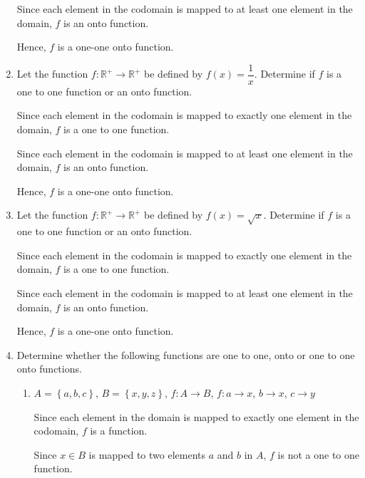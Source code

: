 \documentclass[12pt]{report}
\begin{document}
\begin{enumerate}
            Since each element in the codomain is mapped to at least one element in the
            domain, $f$ is an onto function.

            Hence, $f$ is a one-one onto function. \newpage

      \item Let the function $f: \mathbb{R}^+ \to \mathbb{R}^+$ be defined by $f (x) =
                  \dfrac{1}{x}$. Determine if $f$ is a one to one function or an onto function.
            \sol{}

            Since each element in the codomain is mapped to exactly one element in the
            domain, $f$ is a one to one function.

            Since each element in the codomain is mapped to at least one element in the
            domain, $f$ is an onto function.

            Hence, $f$ is a one-one onto function.

      \item Let the function $f: \mathbb{R}^+ \to \mathbb{R}^+$ be defined by $f (x) =
                  \sqrt{x}$. Determine if $f$ is a one to one function or an onto function.
            \sol{}

            Since each element in the codomain is mapped to exactly one element in the
            domain, $f$ is a one to one function.

            Since each element in the codomain is mapped to at least one element in the
            domain, $f$ is an onto function.

            Hence, $f$ is a one-one onto function.

      \item Determine whether the following functions are one to one, onto or one to one
            onto functions.
            \begin{enumerate}
                  \item $A = \left\{a, b, c\right\}$, $B = \left\{x, y, z\right\}$, $f: A \to
                              B$, $f: a \to x$, $b \to x$, $c \to y$
                        \sol{}

                        Since each element in the domain is mapped to exactly one element in the
                        codomain, $f$ is a function.

                        Since $x \in B$ is mapped to two elements $a$ and $b$ in $A$, $f$ is not a one
                        to one function.


\end{enumerate}
\end{enumerate}
\end{document}
